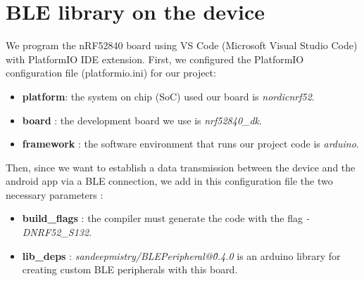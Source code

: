 \section{BLE library on the device}
We program the nRF52840 board using VS Code (Microsoft Visual Studio Code) with PlatformIO IDE extension.
First, we configured the PlatformIO configuration file (platformio.ini) for our project:
\begin{itemize}
    \item \textbf{platform}: the system on chip (SoC) used our board is \textit{nordicnrf52}.
    \item \textbf{board} : the development board we use is \textit{nrf52840\_dk}.
    \item \textbf{framework} : the software environment that runs our project code is \textit{arduino}.
\end{itemize}
Then, since we want to establish a data transmission between the device and the android app via a BLE connection, we add in this configuration file the two necessary parameters : 
\begin{itemize}
    \item \textbf{build\_flags} : the compiler must generate the code with the flag \textit{-DNRF52\_S132}.
    \item \textbf{lib\_deps} : \textit{sandeepmistry/BLEPeripheral@\^0.4.0} is an arduino library for creating custom BLE peripherals with this board.
\end{itemize}
